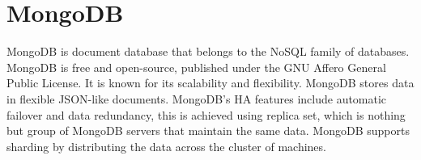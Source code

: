 \section{MongoDB}

MongoDB is document database that belongs to the NoSQL family of 
databases. MongoDB is free and open-source, published under the 
GNU Affero General Public License. It is known for its scalability 
and flexibility. MongoDB stores data in flexible JSON-like 
documents. MongoDB's HA features include automatic failover and 
data redundancy, this is achieved using replica set, which is 
nothing but group of MongoDB servers that maintain the same data. 
MongoDB supports sharding by distributing the data across the 
cluster of machines. \cite{hid-sp18-517-MongoDB-intro}



